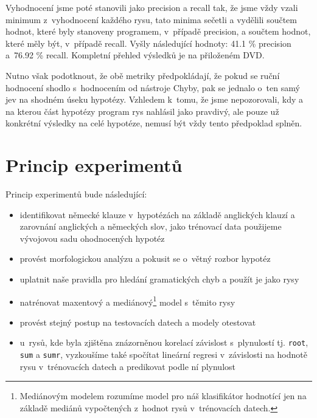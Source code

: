 \documentclass[12pt,a4paper]{report}
\begin{document}
Vyhodnocení jsme poté stanovili jako precision a recall \cite{trec} tak, že jsme vždy vzali minimum z~vyhodnocení každého rysu, tato minima sečetli a vydělili součtem hodnot, které byly stanoveny programem, v~případě precision, a součtem hodnot, které měly být, v~případě recall. Vyšly následující hodnoty: 41.1 \% precision a~76.92 \% recall. Kompletní přehled výsledků je na přiloženém DVD.

Nutno však podotknout, že obě metriky předpokládají, že pokud se ruční hodnocení shodlo s~hodnocením od nástroje Chyby, pak se jednalo o~ten samý jev na shodném úseku hypotézy. Vzhledem k~tomu, že jsme nepozorovali, kdy a na kterou část hypotézy program rys nahlásil jako pravdivý, ale pouze už konkrétní výsledky na celé hypotéze, nemusí být vždy tento předpoklad splněn.



\section{Princip experimentů}

Princip experimentů bude následující:
\begin{itemize}
\item{identifikovat německé klauze v~hypotézách na základě anglických klauzí a zarovnání anglických a německých slov, jako trénovací data použijeme vývojovou sadu ohodnocených hypotéz}
\item{provést morfologickou analýzu a pokusit se o~větný rozbor hypotéz}
\item{uplatnit naše pravidla pro hledání gramatických chyb a použít je jako rysy}
\item{natrénovat maxentový a mediánový\footnote{Mediánovým modelem rozumíme model pro náš klasifikátor hodnotící jen na základě mediánů vypočtených z~hodnot rysů v~trénovacích datech.} model s~těmito rysy}
\item{provést stejný postup na testovacích datech a modely otestovat}
\item{u~rysů, kde byla zjištěna znázorněnou korelací závislost s~plynulostí tj. \texttt{root}, \texttt{sum} a \texttt{sumr}, vyzkoušíme také spočítat lineární regresi v~závislosti na hodnotě rysu v~trénovacích datech a predikovat podle ní plynulost}
\end{itemize}
\end{document}
